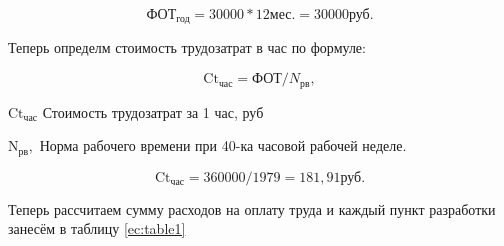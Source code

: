 \begin{equation*}
    \text{ФОТ}_\text{год} = 30 000 * 12 \text{мес.} = 30 000 \text{руб.}
\end{equation*}

Теперь определм стоимость трудозатрат в час по формуле:

\begin{equation}
    \text{Ct}_\text{час} = \text{ФОТ} / N_\text{рв},
\end{equation}

\begin{eqexpl}[5ex]
    \item{$\text{Ct}_\text{час}$} Стоимость трудозатрат за 1 час, руб
    \item{$\text{N}_\text{рв},$} Норма рабочего времени при 40-ка часовой рабочей
неделе.
\end{eqexpl}

\begin{equation*}
    \text{Ct}_\text{час} = 360 000 / 1979 = 181,91 \text{руб}.
\end{equation*}

Теперь рассчитаем сумму расходов на оплату труда и каждый пункт
разработки занесём в таблицу \ref{ec:table1}

